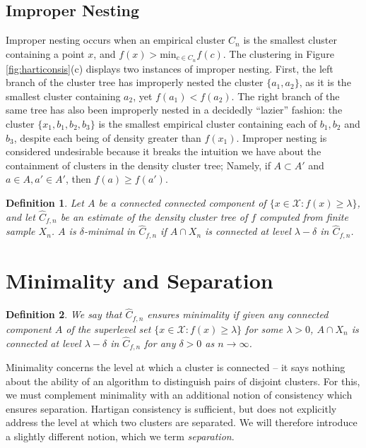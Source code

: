 \documentclass{article}
\newtheorem{definition}{Definition}
\begin{document}
\subsection{Improper Nesting}

Improper nesting occurs when an empirical cluster $C_n$ is the smallest cluster containing a point $x$, and $f(x) > {\text{min}}_{c \in C_n}f(c)$. The clustering in Figure \ref{fig:harticonsis}(c) displays two instances of improper nesting. First, the left branch of the cluster tree has improperly nested the cluster $\{a_1,a_2\}$, as it is the smallest cluster containing $a_2$, yet $f(a_1) < f(a_2)$. The right branch of the same tree has also been improperly nested in a decidedly ``lazier'' fashion: the cluster $\{x_1,b_1,b_2,b_3\}$ is the smallest empirical cluster containing each of $b_1, b_2$ and $b_3$, despite each being of density greater than $f(x_1)$. Improper nesting is considered undesirable because it breaks the intuition we have about the containment of clusters in the density cluster tree; {\color{red} Namely, if $A \subset A'$ and $a \in A, a' \in A'$, then $f(a) \geq f(a')$.} 

\begin{definition}
Let $A$ be a connected connected component of $\{x \in \mathcal{X}: f(x) \geq \lambda\}$, and let ${\hat C}_{f,n}$ be an estimate of the density cluster tree of $f$ computed from finite sample $X_n$. $A$ is $\delta$-minimal in ${\hat C}_{f,n}$ if $A \cap X_n$ is connected at level $\lambda - \delta$ in ${\hat C}_{f,n}$.
\end{definition}

\section{Minimality and Separation}

\begin{definition}
We say that ${\hat C}_{f,n}$ ensures minimality if given any connected component $A$ of the superlevel set $\{x \in \mathcal{X} : f(x) \geq \lambda\}$ for some $\lambda > 0$, $A \cap X_n$ is connected at level $\lambda - \delta$ in ${\hat C}_{f,n}$ for any $\delta > 0$ as $n \rightarrow \infty$.
\end{definition}

Minimality concerns the level at which a cluster is connected -- it says nothing about the ability of an algorithm to distinguish pairs of disjoint clusters. For this, we must complement minimality with an additional notion of consistency which ensures separation. Hartigan consistency is sufficient, but does not explicitly address the level at which two clusters are separated. We will therefore introduce a slightly different notion, which we term \emph{separation}.
\end{document}
